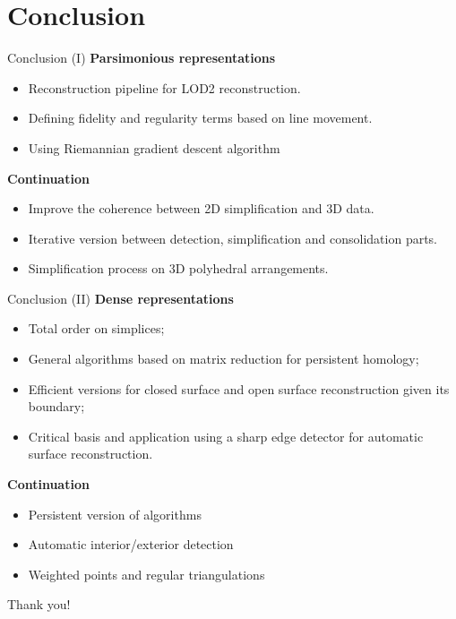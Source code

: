\section{Conclusion}
\begin{frame}{Conclusion (I)}
\scriptsize
\textbf{Parsimonious representations}
\begin{itemize}
	\item<+-> Reconstruction pipeline for LOD2 reconstruction.
	\item<+-> Defining fidelity and regularity terms based on line movement.
	\item<+-> Using Riemannian gradient descent algorithm
\end{itemize}
	
\textbf{Continuation}
\begin{itemize}
	\item Improve the coherence between 2D simplification and 3D data.
	\item Iterative version between detection, simplification and consolidation parts.
	\item Simplification process on 3D polyhedral arrangements.
\end{itemize}

\end{frame}

\begin{frame}{Conclusion (II)}
\scriptsize
\textbf{Dense representations}
\begin{itemize}
	\item<+-> Total order on simplices;
	\item<+-> General algorithms based on matrix reduction for persistent homology;
	\item<+-> Efficient versions for closed surface and open surface reconstruction given its boundary;
	\item<+-> Critical basis and application using a sharp edge detector for automatic surface reconstruction.
\end{itemize}

\textbf{Continuation}
\begin{itemize}
	\item Persistent version of algorithms
	\item Automatic interior/exterior detection
	\item Weighted points and regular triangulations	
\end{itemize}

\end{frame}

\begin{frame}[standout]
	Thank you!
\end{frame}